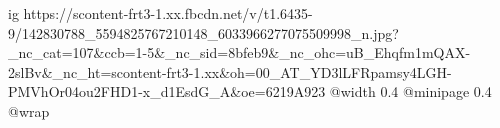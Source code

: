  
 
 
 
 

\ifcmt
  ig https://scontent-frt3-1.xx.fbcdn.net/v/t1.6435-9/142830788_5594825767210148_6033966277075509998_n.jpg?_nc_cat=107&ccb=1-5&_nc_sid=8bfeb9&_nc_ohc=uB_Ehqfm1mQAX-2slBv&_nc_ht=scontent-frt3-1.xx&oh=00_AT_YD3lLFRpamsy4LGH-PMVhOr04ou2FHD1-x_d1EsdG_A&oe=6219A923
  @width 0.4
  @minipage 0.4
  @wrap \parpic[r]
\fi
